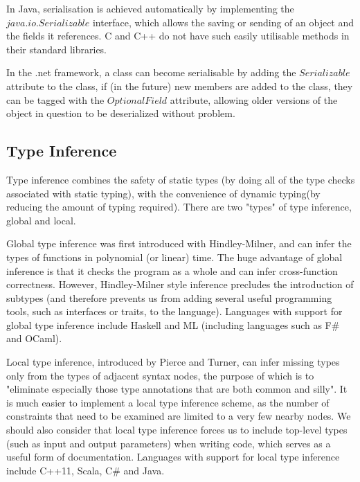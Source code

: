 \documentclass[11pt,a4paper]{report}
\begin{document}
In Java, serialisation is achieved automatically by implementing the $java.io.Serializable$ \cite{java-serializable} interface, which allows the saving or sending of an object and the fields it references.
C and C++ do not have such easily utilisable methods in their standard libraries.

In the .net framework, a class can become serialisable by adding the $Serializable$\cite{net-serializable} attribute to the class, if (in the future) new members are added to the class, they can be tagged with the $OptionalField$ attribute\cite{net-optional}, allowing older versions of the object in question to be deserialized without problem.

\subsection{Type Inference}

Type inference\cite{damas-milner} combines the safety of static types\cite{palsberg199419} (by doing all of the type checks associated with static typing), with the convenience of dynamic typing\cite{Abadi:1991:DTS:103135.103138}(by reducing the amount of typing required).
There are two "types" of type inference, global and local.

Global type inference was first introduced with Hindley-Milner\cite{hindley-milner}, and can infer the types of functions in polynomial (or linear) time.
The huge advantage of global inference is that it checks the program as a whole and can infer cross-function correctness.
However, Hindley-Milner style inference precludes the introduction of subtypes\cite{Mitchell:1984:CTI:800017.800529} (and therefore prevents us from adding several useful programming tools, such as interfaces or traits, to the language).
Languages with support for global type inference include Haskell and ML (including languages such as F\# and OCaml).

Local type inference, introduced by Pierce and Turner\cite{pierce1997local}, can infer missing types only from the types of adjacent syntax nodes\cite{hosoya1999good}, the purpose of which is to "eliminate especially those type annotations that are both common and silly"\cite{pierce2000local}.
It is much easier to implement a local type inference scheme, as the number of constraints that need to be examined are limited to a very few nearby nodes.
We should also consider that local type inference forces us to include top-level types (such as input and output parameters) when writing code, which serves as a useful form of documentation\cite{pierce2000local}.
Languages with support for local type inference include C++11, Scala, C\# and Java.
\end{document}
